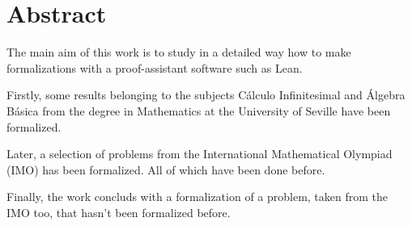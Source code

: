 \chapter*{Abstract}

The main aim of this work is to study in a detailed way how to make
formalizations with a proof-assistant software such as Lean.

Firstly, some results belonging to the subjects Cálculo Infinitesimal
and Álgebra Básica from the degree in Mathematics at the University of
Seville have been formalized.

Later, a selection of problems from the International Mathematical
Olympiad (IMO) has been formalized. All of which have been done before.

Finally, the work concluds with a formalization of a problem, taken from
the IMO too, that hasn't been formalized before.


